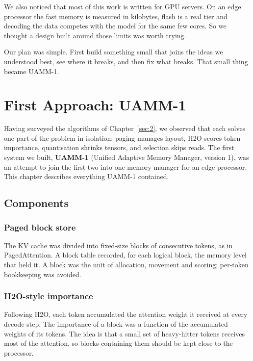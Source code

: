 \documentclass[12pt,a4paper]{report}
\begin{document}
We also noticed that most of this work is written for GPU servers. On an edge processor the fast memory is measured in kilobytes, flash is a real tier and decoding the data competes with the model for the same few cores. So we thought a design built around those limits was worth trying.

Our plan was simple. First build something small that joins the ideas we understood best, see where it breaks, and then fix what breaks. That small thing became UAMM-1.

\section{First Approach: UAMM-1}\label{sec:3}
Having surveyed the algorithms of Chapter~\ref{sec:2}, we observed that each solves one part of the problem in isolation: paging manages layout, H2O scores token importance, quantisation shrinks tensors, and selection skips reads. The first system we built, \textbf{UAMM-1} (Unified Adaptive Memory Manager, version 1), was an attempt to join the first two into one memory manager for an edge processor. This chapter describes everything UAMM-1 contained.

\subsection{Components}\label{sec:3_1}
\subsubsection{Paged block store}\label{sec:3_1_1}
The KV cache was divided into fixed-size blocks of consecutive tokens, as in PagedAttention. A block table recorded, for each logical block, the memory level that held it. A block was the unit of allocation, movement and scoring; per-token bookkeeping was avoided.

\subsubsection{H2O-style importance}\label{sec:3_1_2}
Following H2O, each token accumulated the attention weight it received at every decode step. The importance of a block was a function of the accumulated weights of its tokens. The idea is that a small set of heavy-hitter tokens receives most of the attention, so blocks containing them should be kept close to the processor.
\end{document}
